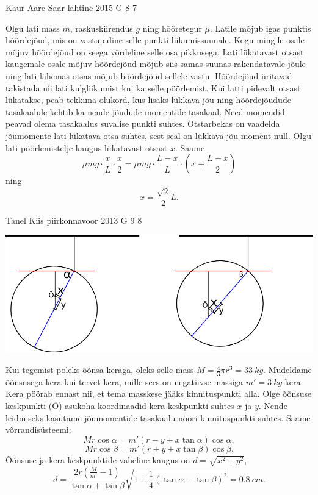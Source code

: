 \documentclass[11pt, twoside]{article}
\begin{document}
{%
{Kaur Aare Saar} %
{lahtine} %
{2015} %
{G 8} %
{7} %
{

\ifSolution
Olgu lati mass $m$, raskuskiirendus $g$ ning hõõretegur $\mu$. Latile mõjub igas punktis hõõrdejõud, mis on vastupidine selle punkti liikumissuunale. Kogu mingile osale mõjuv hõõrdejõud on seega võrdeline selle osa pikkusega. Lati lükatavast otsast kaugemale osale mõjuv hõõrdejõud mõjub siis samas suunas rakendatavale jõule ning lati lähemas otsas mõjub hõõrdejõud sellele vastu. Hõõrdejõud üritavad takistada nii lati kulgliikumist kui ka selle pöörlemist. Kui latti pidevalt otsast lükatakse, peab tekkima olukord, kus lisaks lükkava jõu ning hõõrdejõudude tasakaalule kehtib ka nende jõudude momentide tasakaal. Need momendid peavad olema tasakaalus suvalise punkti suhtes. Otstarbekas on vaadelda jõumomente lati lükatava otsa suhtes, sest seal on lükkava jõu moment null. Olgu lati pöörlemistelje kaugus lükatavast otsast $x$. Saame
\[
\mu mg \cdot \frac{x}{L} \cdot \frac{x}{2}=\mu mg \cdot \frac{L-x}{L} \cdot \left(x+\frac{L-x}{2}\right)
\]
ning
\[
x=\frac{\sqrt{2}}{2}L.
\]
\fi
}

{Tanel Kiis} %
{piirkonnavoor} %
{2013} %
{G 9} %
{8} %
{

\ifSolution
\begin{center}
\includegraphics[width=\textwidth]{2013-v2g-09-kera.png}
\end{center}

Kui tegemist poleks õõnsa keraga, oleks selle mass $M=\frac{4}{3}\pi r^3 = \SI{33}{kg}$. Mudeldame õõnsusega kera kui tervet kera, mille sees on negatiivse massiga $m'=\SI{3}{kg}$ kera. Kera pöörab ennast nii, et tema masskese jääks kinnituspunkti alla. Olge õõnsuse keskpunkti (Õ) asukoha koordinaadid kera keskpunkti suhtes $x$ ja $y$. Nende leidmiseks kasutame jõumomentide tasakaalu nööri kinnituspunkti suhtes. Saame võrrandisüsteemi:
\[Mr \cos \alpha = m'(r-y+x \tan \alpha) \cos \alpha,\]
\[Mr \cos \beta = m'(r+y+x \tan \beta) \cos \beta.\]
Õõnsuse ja kera keskpunktide vaheline kaugus on $d=\sqrt{x^2+y^2}$,
\[ d=\frac{2r(\frac{M}{m'}-1)}{\tan\alpha+\tan\beta}\sqrt{1+\frac{1}{4}(\tan\alpha-\tan\beta)^2} = \SI{0,8}{cm}. \]
\fi
}

}
\end{document}
